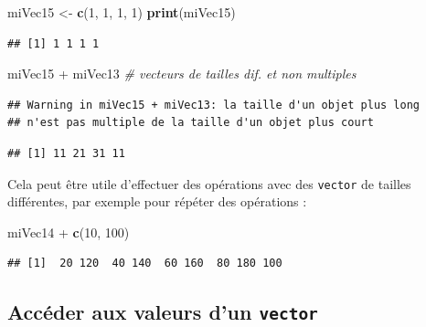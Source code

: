 \documentclass[twoside,symmetric]{book}
\newenvironment{Shaded}{}{}
\newcommand{\CommentTok}[1]{\textit{#1}}
\newcommand{\DecValTok}[1]{#1}
\newcommand{\KeywordTok}[1]{\textbf{#1}}
\newcommand{\NormalTok}[1]{#1}
\newcommand{\OperatorTok}[1]{#1}
\newcommand{\StringTok}[1]{#1}
\begin{document}
\begin{Shaded}
\begin{Highlighting}[]
\NormalTok{miVec15 <-}\StringTok{ }\KeywordTok{c}\NormalTok{(}\DecValTok{1}\NormalTok{, }\DecValTok{1}\NormalTok{, }\DecValTok{1}\NormalTok{, }\DecValTok{1}\NormalTok{)}
\KeywordTok{print}\NormalTok{(miVec15)}
\end{Highlighting}
\end{Shaded}

\begin{verbatim}
## [1] 1 1 1 1
\end{verbatim}

\begin{Shaded}
\begin{Highlighting}[]
\NormalTok{miVec15 }\OperatorTok{+}\StringTok{ }\NormalTok{miVec13 }\CommentTok{# vecteurs de tailles dif. et non multiples}
\end{Highlighting}
\end{Shaded}

\begin{verbatim}
## Warning in miVec15 + miVec13: la taille d'un objet plus long
## n'est pas multiple de la taille d'un objet plus court
\end{verbatim}

\begin{verbatim}
## [1] 11 21 31 11
\end{verbatim}

Cela peut être utile d'effectuer des opérations avec des \texttt{vector} de tailles différentes, par exemple pour répéter des opérations :

\begin{Shaded}
\begin{Highlighting}[]
\NormalTok{miVec14 }\OperatorTok{+}\StringTok{ }\KeywordTok{c}\NormalTok{(}\DecValTok{10}\NormalTok{, }\DecValTok{100}\NormalTok{)}
\end{Highlighting}
\end{Shaded}

\begin{verbatim}
## [1]  20 120  40 140  60 160  80 180 100
\end{verbatim}

\hypertarget{accuxe9der-aux-valeurs-dun-vector}{%
\subsection{\texorpdfstring{Accéder aux valeurs d'un \texttt{vector}}{Accéder aux valeurs d'un vector}}\label{accuxe9der-aux-valeurs-dun-vector}}
\end{document}
